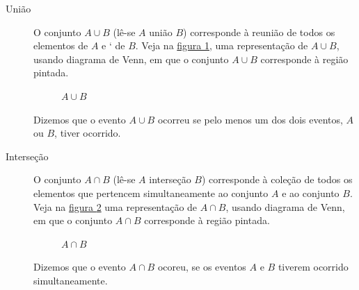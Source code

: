 \begin{description}
  \item[{União}] O conjunto \(A\cup B\) (lê-se \(A\)  união \(B\)) corresponde à reunião de todos os elementos de \(A\) e {}` de \(B\). Veja na \hyperref[aub]{figura \ref{aub}}, uma representação de \(A\cup B\), usando diagrama de Venn, em que o conjunto \(A\cup B\) corresponde à região pintada.

\begin{figure}[H]
\centering

\caption{\(A\cup B\)}
\label{aub}
\end{figure}


Dizemos que o evento \(A\cup B\) ocorreu se pelo menos um dos dois eventos, \(A\) ou \(B\), tiver ocorrido.
\end{description}
\begin{description}
\item [{Interseção}] 
O conjunto \(A\cap B\) (lê-se \(A\) interseção \(B\)) corresponde à coleção de todos os elementos que pertencem simultaneamente ao conjunto \(A\) e ao conjunto \(B\). Veja na \hyperref[intersecao]{figura \ref{intersecao}} uma representação de \(A\cap B\), usando diagrama de Venn, em que o conjunto \(A\cap B\) corresponde à região pintada.
\begin{figure}[H]
\centering

\caption{\(A\cap B\)}
\label{intersecao}
\end{figure}


Dizemos que o evento \(A \cap B\) ocoreu, se os eventos \(A\) e \(B\) tiverem ocorrido simultaneamente.
\end{description}

